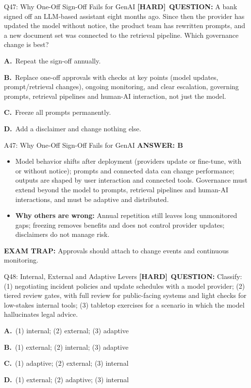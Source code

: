 \documentclass[8pt]{beamer}
\newcommand{\fs}{\fontsize{10}{12}\selectfont}
\newcommand{\opts}[4]{\par\vspace{0.12cm}\noindent\textbf{A.}~#1\par\vspace{0.08cm}\noindent\textbf{B.}~#2\par\vspace{0.08cm}\noindent\textbf{C.}~#3\par\vspace{0.08cm}\noindent\textbf{D.}~#4\par}
\newcommand{\ans}[1]{\textcolor{myblue}{\textbf{ANSWER: #1}}}
\newcommand{\trap}[1]{\textcolor{myred}{\textbf{EXAM TRAP:}} #1}
\newcommand{\hard}{\textcolor{myorange}{\textbf{[HARD]}}}
\begin{document}
\begin{frame}[t]{Q47: Why One-Off Sign-Off Fails for GenAI}
\fs
\hard\ \textbf{QUESTION:} A bank signed off an LLM-based assistant eight months ago. Since then the provider has updated the model without notice, the product team has rewritten prompts, and a new document set was connected to the retrieval pipeline. Which governance change is best?
\opts{Repeat the sign-off annually.}
{Replace one-off approvals with checks at key points (model updates, prompt/retrieval changes), ongoing monitoring, and clear escalation, governing prompts, retrieval pipelines and human-AI interaction, not just the model.}
{Freeze all prompts permanently.}
{Add a disclaimer and change nothing else.}
\end{frame}

\begin{frame}[t]{A47: Why One-Off Sign-Off Fails for GenAI}
\fs
\ans{B}
\begin{itemize}
\item Model behavior shifts after deployment (providers update or fine-tune, with or without notice); prompts and connected data can change performance; outputs are shaped by user interaction and connected tools. Governance must extend beyond the model to prompts, retrieval pipelines and human-AI interactions, and must be adaptive and distributed.
\item \textbf{Why others are wrong:} Annual repetition still leaves long unmonitored gaps; freezing removes benefits and does not control provider updates; disclaimers do not manage risk.
\end{itemize}
\trap{Approvals should attach to \textcolor{myblue}{change events and continuous monitoring}.}
\end{frame}

\begin{frame}[t]{Q48: Internal, External and Adaptive Levers}
\fs
\hard\ \textbf{QUESTION:} Classify: (1) negotiating incident policies and update schedules with a model provider; (2) tiered review gates, with full review for public-facing systems and light checks for low-stakes internal tools; (3) tabletop exercises for a scenario in which the model hallucinates legal advice.
\opts{(1) internal; (2) external; (3) adaptive}
{(1) external; (2) internal; (3) adaptive}
{(1) adaptive; (2) external; (3) internal}
{(1) external; (2) adaptive; (3) internal}
\end{frame}
\end{document}
